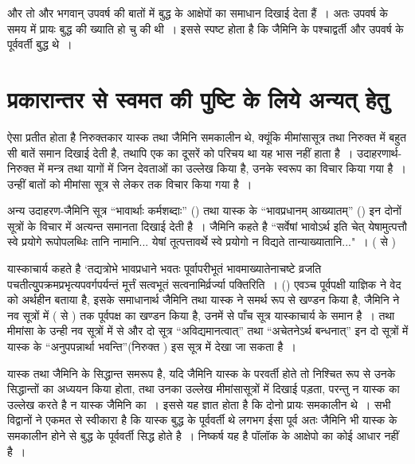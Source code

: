 और तो और भगवान् उपवर्ष की बातों में बुद्ध के आक्षेपों का समाधान दिखाई देता हैं~। अतः उपवर्ष के समय में प्रायः बुद्ध की ख्याति हो चु की थी~। इससे स्पष्ट होता है कि जैमिनि के पश्चाद्वर्ती और उपवर्ष के पूर्ववर्ती बुद्ध थे~। 

\vspace{-.3cm}

\section*{प्रकारान्तर से स्वमत की पुष्टि के लिये अन्यत् हेतु}

ऐसा प्रतीत होता है निरुक्तकार यास्क तथा जैमिनि समकालीन थे, क्यूंकि मीमांसासूत्र तथा निरुक्त में बहुत सी बातें समान दिखाई देती है, तथापि एक का दूसरें को परिचय था यह भास नहीं हाता है~। उदाहरणार्थ-निरुक्त  में मन्त्र तथा यागों में जिन देवताओं का उल्लेख किया है, उनके स्वरूप का विचार किया गया है~। उन्हीं बातों को मीमांसा सूत्र  से लेकर  तक विचार किया गया है~। 

अन्य उदाहरण-जैमिनि सूत्र “भावार्थाः कर्मशब्दाः” () तथा यास्क के “भावप्रधानम् आख्यातम्” () इन दोनों सूत्रों के विचार में अत्यन्त समानता दिखाई देती है~। जैमिनि कहते है “सर्वेषां भावोऽर्थ इति चेत् येषामुत्पत्तौ स्वे प्रयोगे रूपोपलब्धिः तानि नामानि... येषां तूत्पत्तावर्थे स्वे प्रयोगो न विद्यते तान्याख्यातानि..."~। ( से )

यास्काचार्य कहते है ‘तद्यत्रोभे भावप्रधाने भवतः पूर्वापरीभूतं भावमाख्यातेनाचष्टे व्रजति पचतीत्युुपक्रमप्रभृत्यपवर्गपर्यन्तं मूर्त्तं सत्वभूतं सत्वनामिर्व्रर्ज्या पक्तिरिति~। () एवञ्च पूर्वपक्षी याज्ञिक ने वेद को अर्थहीन बताया है, इसके समाधानार्थ जैमिनि तथा यास्क ने समर्थ रूप से खण्डन किया है, जैमिनि ने नव सूत्रों में ( से ) तक पूर्वपक्ष का खण्डन किया है, उनमें से पाँच सूत्र यास्काचार्य के समान है~। तथा मीमांसा के उन्ही नव सूत्रों में से और दो सूत्र “अविद्यमानत्वात्” तथा “अचेतनेऽर्थ बन्धनात्” इन दो सूत्रों में यास्क के “अनुपपन्नार्था भवन्ति”(निरुक्त ) इस सूत्र में देखा जा सकता है~।

यास्क तथा जैमिनि के सिद्धान्त समरूप है, यदि जैमिनि यास्क के परवर्ती होते तो निश्चित रूप से उनके सिद्धान्तों का अध्ययन किया होता, तथा उनका उल्लेख मीमांसासूत्रों में दिखाई पड़ता, परन्तु न यास्क का उल्लेख करते है न यास्क जैमिनि का~। इससे यह ज्ञात होता है कि दोनो प्रायः समकालीन थे~। सभी विद्वानों ने एकमत से स्वीकारा है कि यास्क बुद्ध के पूर्ववर्ती थे लगभग  ईसा पूर्व अतः जैमिनि भी यास्क के समकालीन होने से बुद्ध के पूर्ववर्ती सिद्ध होते है~। निष्कर्ष यह है पॉलॉक के आक्षेपो का कोई आधार नहीं है~।

